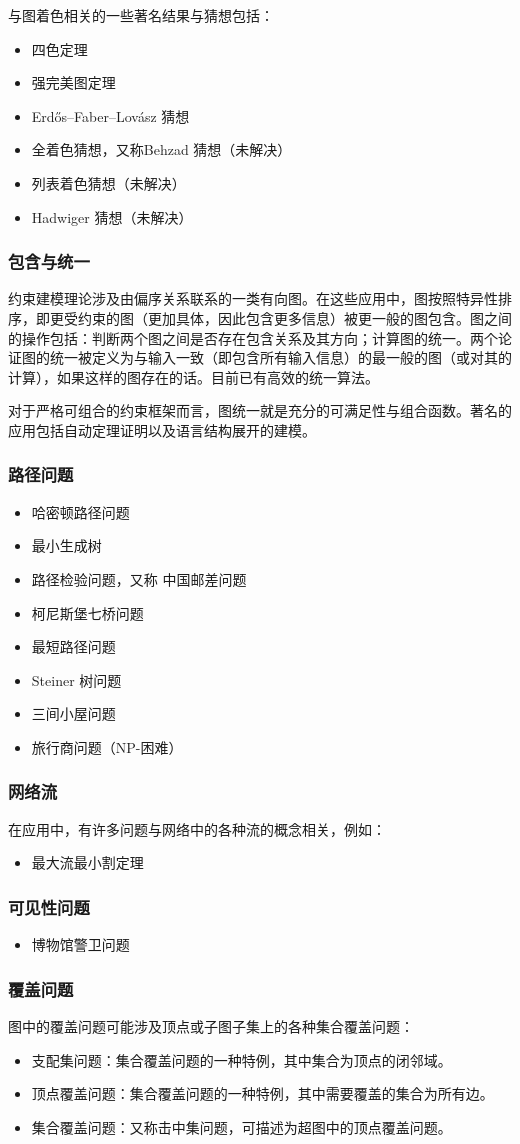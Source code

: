 与图着色相关的一些著名结果与猜想包括：
\begin{itemize}
\item 四色定理
\item 强完美图定理
\item Erdős–Faber–Lovász 猜想
\item 全着色猜想，又称Behzad 猜想（未解决）
\item 列表着色猜想（未解决）
\item Hadwiger 猜想（未解决）
\end{itemize}
\subsubsection{包含与统一}
约束建模理论涉及由偏序关系联系的一类有向图。在这些应用中，图按照特异性排序，即更受约束的图（更加具体，因此包含更多信息）被更一般的图包含。图之间的操作包括：判断两个图之间是否存在包含关系及其方向；计算图的统一。两个论证图的统一被定义为与输入一致（即包含所有输入信息）的最一般的图（或对其的计算），如果这样的图存在的话。目前已有高效的统一算法。

对于严格可组合的约束框架而言，图统一就是充分的可满足性与组合函数。著名的应用包括自动定理证明以及语言结构展开的建模。
\subsubsection{路径问题}
\begin{itemize}
\item 哈密顿路径问题
\item 最小生成树
\item 路径检验问题，又称 中国邮差问题
\item 柯尼斯堡七桥问题
\item 最短路径问题
\item Steiner 树问题
\item 三间小屋问题
\item 旅行商问题（NP-困难）
\end{itemize}
\subsubsection{网络流}
在应用中，有许多问题与网络中的各种流的概念相关，例如：
\begin{itemize}
\item 最大流最小割定理
\end{itemize}
\subsubsection{可见性问题}
\begin{itemize}
\item 博物馆警卫问题
\end{itemize}
\subsubsection{覆盖问题}
图中的覆盖问题可能涉及顶点或子图子集上的各种集合覆盖问题：
\begin{itemize}
\item 支配集问题：集合覆盖问题的一种特例，其中集合为顶点的闭邻域。
\item 顶点覆盖问题：集合覆盖问题的一种特例，其中需要覆盖的集合为所有边。
\item 集合覆盖问题：又称击中集问题，可描述为超图中的顶点覆盖问题。
\end{itemize}
